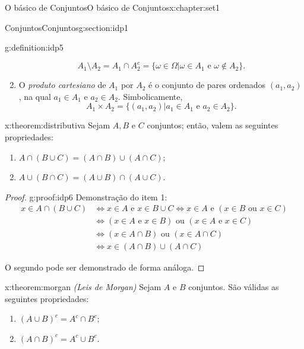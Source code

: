 \documentclass[oneside,10pt,]{book}
\numberwithin{equation}{section}
\newcommand{\amp}{&}
\begin{document}
\begin{chapterptx}{O básico de Conjuntos}{}{O básico de Conjuntos}{}{}{x:chapter:set1}
\begin{sectionptx}{Conjuntos}{}{Conjuntos}{}{}{g:section:idp1}
\begin{definition}{}{g:definition:idp5}
\begin{multicols}{1}
\begin{enumerate}
\begin{equation*}
A_1\setminus A_2 = A_1\cap A_2^c = \{ \omega\in\Omega | \omega\in A_1 \text{ e } \omega\notin A_2 \}.
\end{equation*}
%
\item{}O \emph{produto cartesiano} de \(A_1\) por \(A_2\) é o conjunto de pares ordenados \((a_1, a_2)\), na qual \(a_1\in A_1\) e \(a_2\in A_2\). Simbolicamente,%
\begin{equation*}
A_1\times A_2 = \{ (a_1, a_2)| a_1\in A_1 \text{ e } a_2\in A_2 \}. 
\end{equation*}
%
\end{enumerate}
\end{multicols}
\end{definition}
\begin{theorem}{}{}{x:theorem:distributiva}%
Sejam \(A, B\) e \(C\) conjuntos; então, valem as seguintes propriedades:%
\begin{enumerate}
\item{}\(\displaystyle A\cap (B\cup C) = (A\cap B)\cup(A\cap C);\)%
\item{}\(\displaystyle A\cup (B\cap C) = (A\cup B)\cap(A\cup C).\)%
\end{enumerate}
%
\end{theorem}
\begin{proof}{}{g:proof:idp6}
Demonstração do item 1:%
\begin{align*}
x\in A\cap(B\cup C) \amp \Leftrightarrow x\in A \text{ e } x\in B\cup C \Leftrightarrow x\in A \text{ e } (x\in B \text{ ou } x\in C) \\
\amp \Leftrightarrow (x\in A \text{ e }x\in B) \text{ ou } (x\in A\text{ e }x\in C) \\
\amp \Leftrightarrow (x\in A\cap B) \text{ ou } (x\in A\cap C) \\
\amp \Leftrightarrow x\in (A\cap B)\cup(A\cap C) 
\end{align*}
%
\par
O segundo pode ser demonstrado de forma análoga.%
\end{proof}
\begin{theorem}{}{}{x:theorem:morgan}%
\emph{(Leis de Morgan)} Sejam \(A\) e \(B\) conjuntos. São válidas as seguintes propriedades:%
\begin{enumerate}
\item{}\(\displaystyle (A \cup B)^c=A^c \cap B^c;\)%
\item{}\(\displaystyle (A \cap B)^c=A^c \cup B^c.\)%
\end{enumerate}

\end{theorem}
\end{sectionptx}
\end{chapterptx}
\end{document}
